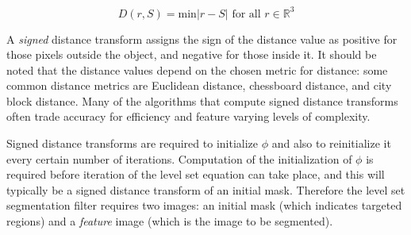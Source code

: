 	\begin{equation}
	D(r,S) = \textrm{min}{|r-S|} \textrm{ for all } r \in \mathbb{R}^3
	\label{eq:distancetransform}
	\end{equation}

A \textit{signed} distance transform assigns the sign of the distance value as positive for those pixels outside the object, and negative for those inside it. It should be noted that the distance values depend on the chosen metric for distance: some common distance metrics are Euclidean distance, chessboard distance, and city block distance. Many of the algorithms that compute signed distance transforms often trade accuracy for efficiency and feature varying levels of complexity.

Signed distance transforms are required to initialize $\phi$ and also to reinitialize it every certain number of iterations. Computation of the initialization of $\phi$ is required before iteration of the level set equation can take place, and this will typically be a signed distance transform of an initial mask. Therefore the level set segmentation filter requires two images: an initial mask (which indicates targeted regions) and a \textit{feature} image (which is the image to be segmented). 
	
